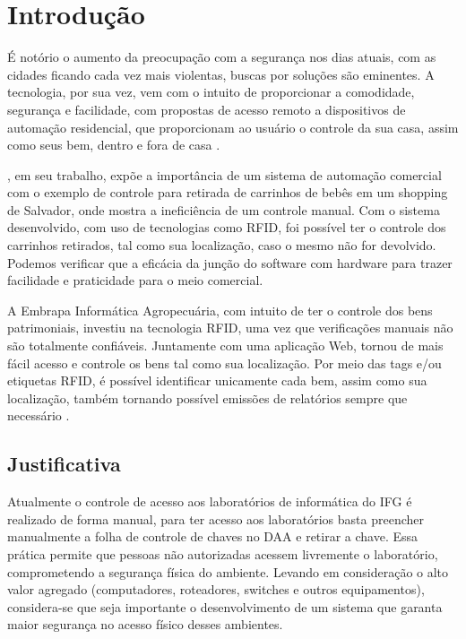 \chapter{Introdução}\label{Introducao}

É notório o aumento da preocupação com a segurança nos dias atuais, com as cidades ficando cada vez mais violentas,  buscas por soluções são eminentes. A tecnologia, por sua vez, vem com o intuito de proporcionar a comodidade, segurança e facilidade, com propostas de acesso remoto a dispositivos de automação residencial, que proporcionam ao usuário o controle da sua casa, assim como seus bem, dentro e fora de casa \citep{Wortmeyer2005}.

\citep{Silva2016}, em seu trabalho, expõe a importância de um sistema de automação comercial com o exemplo de controle para retirada de carrinhos de bebês em um shopping de Salvador, onde mostra a ineficiência de um controle manual. Com o sistema desenvolvido, com uso de tecnologias como \acf{RFID}, foi possível ter o controle dos carrinhos retirados, tal como sua localização, caso o mesmo não for devolvido. Podemos verificar que a eficácia da junção do software com hardware para trazer facilidade e praticidade para o meio comercial.

A Embrapa Informática Agropecuária, com intuito de ter o controle dos bens patrimoniais, investiu na tecnologia RFID, uma vez que verificações manuais não são totalmente confiáveis. Juntamente com uma aplicação Web, tornou de mais fácil acesso e controle os bens tal como sua localização. Por meio das tags e/ou etiquetas RFID, é possível identificar unicamente cada bem, assim como sua localização, também tornando possível emissões de relatórios sempre que necessário \citep{Narciso2008}.


\section{Justificativa}

Atualmente o controle de acesso aos laboratórios de informática do IFG é realizado de forma manual, para ter acesso aos laboratórios basta preencher manualmente a folha de controle de chaves no \acf{DAA} e retirar a chave. Essa prática permite que pessoas não autorizadas acessem livremente o laboratório, comprometendo a segurança física do ambiente. Levando em consideração o alto valor agregado (computadores, roteadores, switches e outros equipamentos), considera-se que seja importante o desenvolvimento de um sistema que garanta maior segurança no acesso físico desses ambientes.

